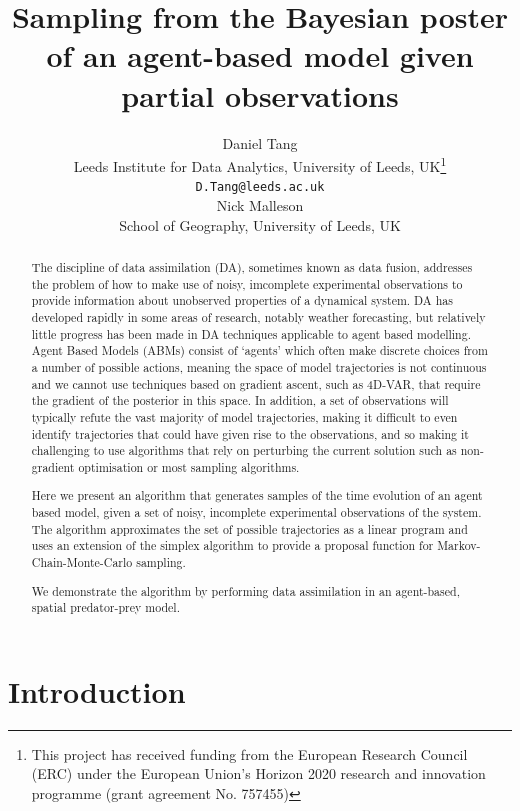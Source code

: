 \documentclass{article}
\title{Sampling from the Bayesian poster of an agent-based model given partial observations}
\author{
  Daniel Tang\\
    Leeds Institute for Data Analytics, University of Leeds, UK\thanks{This project has received funding from the European Research Council (ERC) under the European Union’s Horizon 2020 research and innovation programme (grant agreement No. 757455)}\\
  \texttt{D.Tang@leeds.ac.uk}\\
  \AND
  Nick Malleson\\
  School of Geography, University of Leeds, UK\\  
}
\begin{document}
\maketitle

\begin{abstract}
The discipline of data assimilation (DA), sometimes known as data fusion, addresses the problem of how to make use of noisy, imcomplete experimental observations to provide information about unobserved properties of a dynamical system. DA has developed rapidly in some areas of research, notably weather forecasting, but relatively little progress has been made in DA techniques applicable to agent based modelling. Agent Based Models (ABMs) consist of `agents' which often make discrete choices from a number of possible actions, meaning the space of model trajectories is not continuous and we cannot use techniques based on gradient ascent, such as 4D-VAR, that require the gradient of the posterior in this space. In addition, a set of observations will typically refute the vast majority of model trajectories, making it difficult to even identify trajectories that could have given rise to the observations, and so making it challenging to use algorithms that rely on perturbing the current solution such as non-gradient optimisation or most sampling algorithms.

Here we present an algorithm that generates samples of the time evolution of an agent based model, given a set of noisy, incomplete experimental observations of the system. The algorithm approximates the set of possible trajectories as a linear program and uses an extension of the simplex algorithm to provide a proposal function for Markov-Chain-Monte-Carlo sampling.

We demonstrate the algorithm by performing data assimilation in an agent-based, spatial predator-prey model.
\end{abstract}


\section{Introduction}
\end{document}

